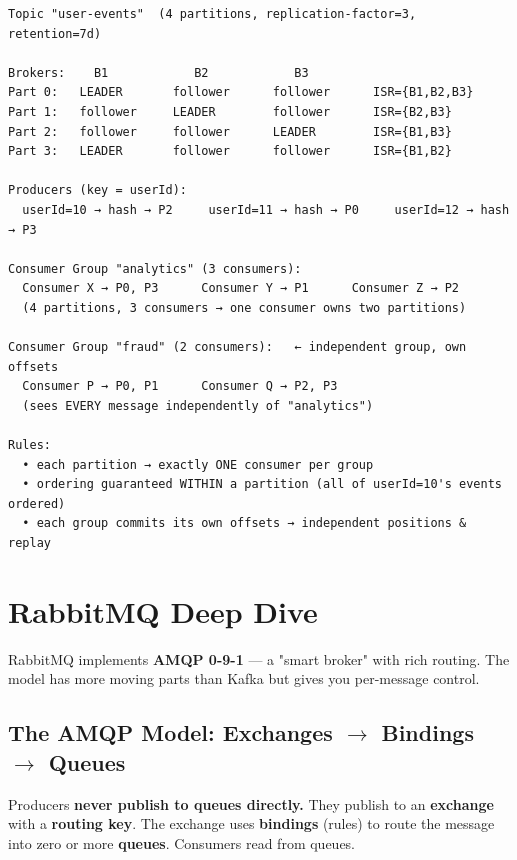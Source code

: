\documentclass[11pt]{article}
\begin{document}
\begin{verbatim}
Topic "user-events"  (4 partitions, replication-factor=3, retention=7d)

Brokers:    B1            B2            B3
Part 0:   LEADER       follower      follower      ISR={B1,B2,B3}
Part 1:   follower     LEADER        follower      ISR={B2,B3}
Part 2:   follower     follower      LEADER        ISR={B1,B3}
Part 3:   LEADER       follower      follower      ISR={B1,B2}

Producers (key = userId):
  userId=10 → hash → P2     userId=11 → hash → P0     userId=12 → hash → P3

Consumer Group "analytics" (3 consumers):
  Consumer X → P0, P3      Consumer Y → P1      Consumer Z → P2
  (4 partitions, 3 consumers → one consumer owns two partitions)

Consumer Group "fraud" (2 consumers):   ← independent group, own offsets
  Consumer P → P0, P1      Consumer Q → P2, P3
  (sees EVERY message independently of "analytics")

Rules:
  • each partition → exactly ONE consumer per group
  • ordering guaranteed WITHIN a partition (all of userId=10's events ordered)
  • each group commits its own offsets → independent positions & replay
\end{verbatim}

\section{RabbitMQ Deep Dive}\label{rabbitmq-deep-dive}

RabbitMQ implements \textbf{AMQP 0-9-1} --- a "smart broker" with rich routing. The model has more moving parts than Kafka but gives you per-message control.

\subsection{\texorpdfstring{The AMQP Model: Exchanges \(\rightarrow\) Bindings \(\rightarrow\) Queues}{The AMQP Model: Exchanges \textbackslash rightarrow Bindings \textbackslash rightarrow Queues}}\label{the-amqp-model-exchanges-rightarrow-bindings-rightarrow-queues}

Producers \textbf{never publish to queues directly.} They publish to an \textbf{exchange} with a \textbf{routing key}. The exchange uses \textbf{bindings} (rules) to route the message into zero or more \textbf{queues}. Consumers read from queues.

\setcodelang{}
\end{document}
